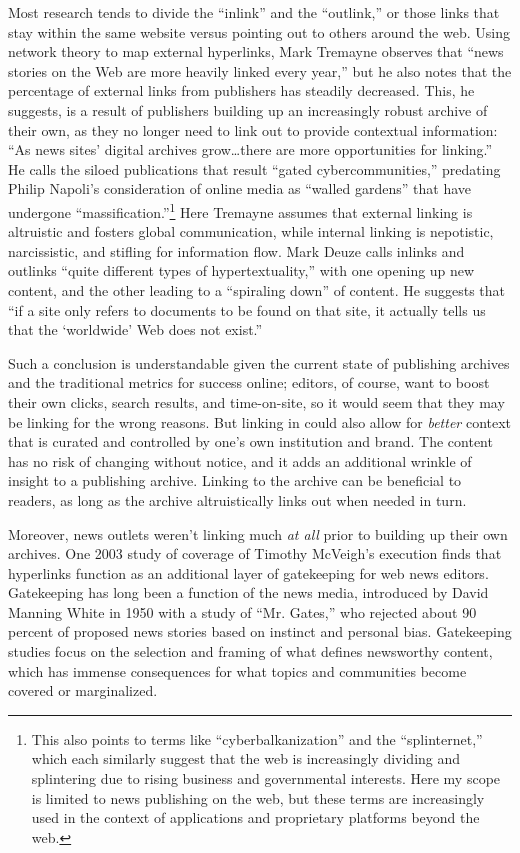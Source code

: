 Most research tends to divide the ``inlink'' and the ``outlink,'' or those links that stay within the same website versus pointing out to others around the web. Using network theory to map external hyperlinks, Mark Tremayne observes that ``news stories on the Web are more heavily linked every year,'' but he also notes that the percentage of external links from publishers has steadily decreased.\autocite[49]{li_applying_2013} This, he suggests, is a result of publishers building up an increasingly robust archive of their own, as they no longer need to link out to provide contextual information: ``As news sites' digital archives grow\ldots there are more opportunities for linking.''\autocite[241]{tremayne_web_2004} He calls the siloed publications that result ``gated cybercommunities,'' predating Philip Napoli's consideration of online media as ``walled gardens'' that have undergone ``massification.''\footnote{This also points to terms like ``cyberbalkanization'' and the ``splinternet,'' which each similarly suggest that the web is increasingly dividing and splintering due to rising business and governmental interests. Here my scope is limited to news publishing on the web, but these terms are increasingly used in the context of applications and proprietary platforms beyond the web.} Here Tremayne assumes that external linking is altruistic and fosters global communication, while internal linking is nepotistic, narcissistic, and stifling for information flow. Mark Deuze calls inlinks and outlinks ``quite different types of hypertextuality,'' with one opening up new content, and the other leading to a ``spiraling down'' of content. He suggests that ``if a site only refers to documents to be found on that site, it actually tells us that the `worldwide' Web does not exist.''\autocite{deuze_online_2001}

Such a conclusion is understandable given the current state of publishing archives and the traditional metrics for success online; editors, of course, want to boost their own clicks, search results, and time-on-site, so it would seem that they may be linking for the wrong reasons. But linking in could also allow for \emph{better} context that is curated and controlled by one's own institution and brand. The content has no risk of changing without notice, and it adds an additional wrinkle of insight to a publishing archive. Linking to the archive can be beneficial to readers, as long as the archive altruistically links out when needed in turn.

Moreover, news outlets weren't linking much \emph{at all} prior to building up their own archives. One 2003 study of coverage of Timothy McVeigh's execution finds that hyperlinks function as an additional layer of gatekeeping for web news editors. Gatekeeping has long been a function of the news media, introduced by David Manning White in 1950 with a study of ``Mr. Gates,'' who rejected about 90 percent of proposed news stories based on instinct and personal bias. Gatekeeping studies focus on the selection and framing of what defines newsworthy content, which has immense consequences for what topics and communities become covered or marginalized.

